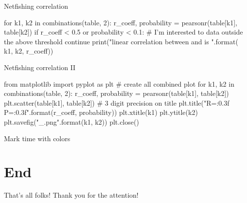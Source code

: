 \begin{pyframe}{Netfishing correlation}
\begin{pythoncode}
for k1, k2 in combinations(table, 2):
    r_coeff, probability = pearsonr(table[k1], table[k2])
    if r_coeff < 0.5 or probability < 0.1:
        # I'm interested to data outside the above threshold
        continue
    print("linear correlation between {} and {} is {}".format(
        k1, k2, r_coeff))

\end{pythoncode}
\end{pyframe}

\begin{pyframe}{Netfishing correlation II}
\begin{pythoncode}
from matplotlib import pyplot as plt
# create all combined plot
for k1, k2 in combinations(table, 2):
    r_coeff, probability = pearsonr(table[k1], table[k2])
    plt.scatter(table[k1], table[k2])
    # 3 digit precision on title
    plt.title("R={:0.3f} P={:0.3f}".format(r_coeff, probability))
    plt.xtitle(k1) 
    plt.ytitle(k2)
    plt.savefig("{}_{}.png".format(k1, k2))
    plt.close()
\end{pythoncode}
\end{pyframe}


\begin{pyframe}{Mark time with colors}
\end{pyframe}

\section{End}
\begin{pyframe}{That's all folks!}
Thank you for the attention!
\end{pyframe}


